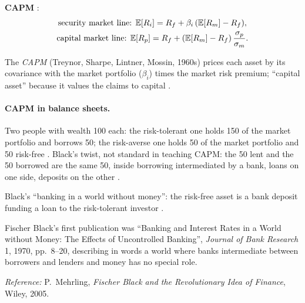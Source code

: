 \begin{paracol}{2}
\begin{keyformulas}
\textbf{CAPM} :
\begin{gather*}
  \text{security market line: } \mathbb{E}[R_i] = R_f + \beta_i\,(\mathbb{E}[R_m]-R_f),\\
  \text{capital market line: } \mathbb{E}[R_p] = R_f + (\mathbb{E}[R_m]-R_f)\,\frac{\sigma_p}{\sigma_m}.
\end{gather*}
\end{keyformulas}

\begin{definition}
The \emph{CAPM} (Treynor, Sharpe, Lintner, Mossin, 1960s) prices each asset by its covariance with the market portfolio ($\beta_i$) times the market risk premium; ``capital
asset'' because it values the claims to capital .
\end{definition}

\paragraph{CAPM in balance sheets.} Two people with wealth 100 each: the risk-tolerant one holds 150 of the market portfolio and borrows 50; the risk-averse one holds 50 of
the market portfolio and 50 risk-free . Black's twist, not standard in teaching CAPM: the
50 lent and the 50 borrowed are the same 50, inside borrowing intermediated by a bank, loans on one side, deposits on the other .

\begin{nfigure}
\begin{taccts}
\quad
{}\quad
{}
\end{taccts}
\caption{Black's ``banking in a world without money'': the risk-free asset is a bank deposit funding a loan to the risk-tolerant investor .}\label{fig:tv-black}
\end{nfigure}

\begin{history}
Fischer Black's first publication was ``Banking and Interest Rates in a World without Money: The Effects of Uncontrolled Banking'', \emph{Journal of Bank Research} 1, 1970,
pp.~8--20, describing in words a world where banks intermediate between borrowers and lenders and money has no special role.\par
\emph{Reference:} P.~Mehrling, \emph{Fischer Black and the Revolutionary Idea of Finance}, Wiley, 2005.
\end{history}


\end{paracol}
